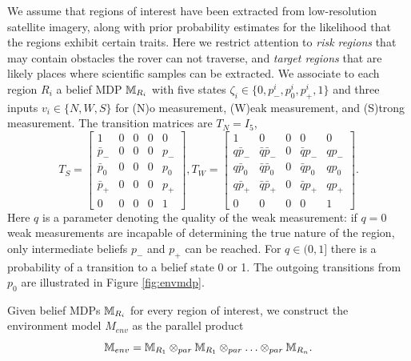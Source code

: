 \documentclass[conference]{IEEEtran}
\begin{document}
We assume that regions of interest have been extracted from low-resolution satellite imagery, along with prior probability estimates for the likelihood that the regions exhibit certain traits. Here we restrict attention to \emph{risk regions} that may contain obstacles the rover can not traverse, and \emph{target regions} that are likely places where scientific samples can be extracted. We associate to each region $R_i$ a belief MDP $\mathbb{M}_{R_i}$ with five states $\zeta_i \in \{ 0, p^i_-, p^i_0, p^i_+, 1\}$ and three inputs $v_i \in \{ N, W, S \}$ for (N)o measurement, (W)eak measurement, and (S)trong measurement. The transition matrices are $T_N = I_5$, 
\begin{equation}
  T_{S} = \left[\begin{smallmatrix}
    1        &  0  &  0  &  0  &  0   \\
    \bar p_- &  0  &  0  &  0  &  p_- \\
    \bar p_0 &  0  &  0  &  0  &  p_0 \\
    \bar p_+ &  0  &  0  &  0  &  p_+ \\
    0        &  0  &  0  &  0  &  1
  \end{smallmatrix}\right],
  T_{W} = \left[\begin{smallmatrix}
    1        &  0                &  0  &  0           &  0   \\
    q\bar p_-&  \bar q \bar p_-  &  0  &  \bar q p_-  &  q p_- \\
    q\bar p_0&  \bar q \bar p_0  &  0  &  \bar q p_0  &  q p_0 \\
    q\bar p_+&  \bar q \bar p_+  &  0  &  \bar q p_+  &  q p_+ \\
    0        &  0  &  0  &  0  &  1
  \end{smallmatrix}\right].
\end{equation}
Here $q$ is a parameter denoting the quality of the weak measurement: if $q=0$ weak measurements are incapable of determining the true nature of the region, only intermediate beliefs $p_-$ and $p_+$ can be reached. For $q \in (0,1]$ there is a probability of a transition to a belief state 0 or 1. The outgoing transitions from $p_0$ are illustrated in Figure \ref{fig:envmdp}.

Given belief MDPs $\mathbb{M}_{R_i}$ for every region of interest, we construct the environment model $M_{env}$ as the parallel product
\begin{equation}
  \mathbb{M}_{env} = \mathbb{M}_{R_1} \otimes_{par} \mathbb{M}_{R_1}  \otimes_{par} \ldots \otimes_{par} \mathbb{M}_{R_n}. 
\end{equation}
\end{document}
